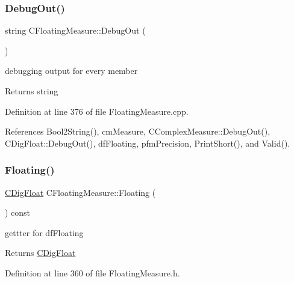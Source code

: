 \subsubsection{\texorpdfstring{Debug\+Out()}{DebugOut()}}
{\footnotesize\ttfamily string C\+Floating\+Measure\+::\+Debug\+Out (\begin{DoxyParamCaption}{ }\end{DoxyParamCaption})}



debugging output for every member 

\begin{DoxyReturn}{Returns}
string 
\end{DoxyReturn}


Definition at line 376 of file Floating\+Measure.\+cpp.



References Bool2\+String(), cm\+Measure, C\+Complex\+Measure\+::\+Debug\+Out(), C\+Dig\+Float\+::\+Debug\+Out(), df\+Floating, pfm\+Precision, Print\+Short(), and Valid().

\mbox{\label{classCFloatingMeasure_ab41354d28783d125159bd6e9372c6d9f}} 
\subsubsection{\texorpdfstring{Floating()}{Floating()}\hspace{0.1cm}{\footnotesize\ttfamily [1/2]}}
{\footnotesize\ttfamily \hyperlink{classCDigFloat}{C\+Dig\+Float} C\+Floating\+Measure\+::\+Floating (\begin{DoxyParamCaption}{ }\end{DoxyParamCaption}) const\hspace{0.3cm}{\ttfamily [inline]}}



gettter for df\+Floating 

\begin{DoxyReturn}{Returns}
\hyperlink{classCDigFloat}{C\+Dig\+Float} 
\end{DoxyReturn}


Definition at line 360 of file Floating\+Measure.\+h.

\mbox{\label{classCFloatingMeasure_aa33fe952e9c01f5f76cef5e6f0d03864}} 
